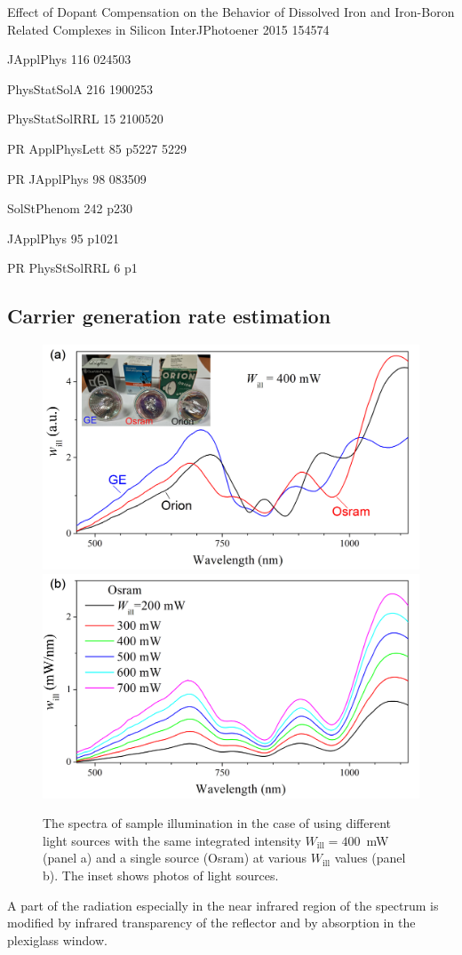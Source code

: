 \documentclass{WileyMSP-template}
\begin{document}
Effect of Dopant Compensation on the Behavior of Dissolved
Iron and Iron-Boron Related Complexes in Silicon InterJPhotoener 2015 154574 \cite{Zhu2015}

JApplPhys 116 024503 \cite{FeBAssJAP2014}

PhysStatSolA 216 1900253 \cite{FeBKin2019}

PhysStatSolRRL 15 2100520 \cite{Sun2021}

PR ApplPhysLett 85 p5227 5229 \cite{FeBLight2}

PR JApplPhys 98 083509 \cite{FeBJAP2005}

SolStPhenom 242 p230 \cite{lauer2016}

JApplPhys 95 p1021 \cite{Macdonald2004}

PR PhysStSolRRL 6 p1 \cite{FeMethod2012}






\subsection{Carrier generation rate estimation}\label{SecG}

\begin{figure}
\centering
  \includegraphics[width=0.4\linewidth]{Fig4a.png}
  \includegraphics[width=0.4\linewidth]{Fig4b.png}
  \caption{
  The spectra of sample illumination in the case of using different light sources
  with the same integrated intensity $W_\mathrm{ill}=400$~mW (panel a) and a single source (Osram)
 at various $W_\mathrm{ill}$ values (panel b).
 The inset shows photos of light sources.
}
  \label{fig4}
\end{figure}

A part of the radiation especially in the near infrared region of the spectrum is modified by infrared transparency of the reflector and by absorption in
the plexiglass window. \cite{Libra2017}
\end{document}
